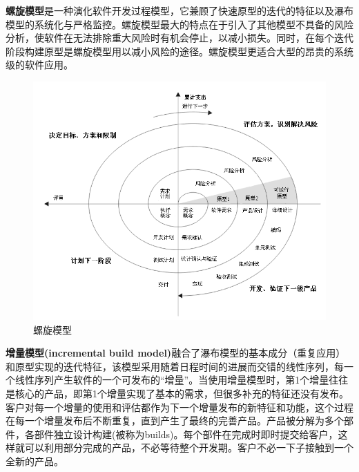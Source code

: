 \textbf{螺旋模型}是一种演化软件开发过程模型，它兼顾了快速原型的迭代的特征以及瀑布模型的系统化与严格监控。螺旋模型最大的特点在于引入了其他模型不具备的风险分析，使软件在无法排除重大风险时有机会停止，以减小损失。同时，在每个迭代阶段构建原型是螺旋模型用以减小风险的途径。螺旋模型更适合大型的昂贵的系统级的软件应用。
\begin{figure}[ht]
	\begin{center}
		\includegraphics[keepaspectratio,width=0.5\paperwidth]{Pictures/SpiralModelChinese.png}
	\caption{螺旋模型}
	\label{fig:processmemlayout}
	\end{center}
\end{figure}

\textbf{增量模型(incremental build model)}融合了瀑布模型的基本成分（重复应用）和原型实现的迭代特征，该模型采用随着日程时间的进展而交错的线性序列，每一个线性序列产生软件的一个可发布的“增量”。当使用增量模型时，第1个增量往往是核心的产品，即第1个增量实现了基本的需求，但很多补充的特征还没有发布。客户对每一个增量的使用和评估都作为下一个增量发布的新特征和功能，这个过程在每一个增量发布后不断重复，直到产生了最终的完善产品。产品被分解为多个部件，各部件独立设计构建(被称为builds)。每个部件在完成时即时提交给客户，这样就可以利用部分完成的产品，不必等待整个开发期。客户不必一下子接触到一个全新的产品。


